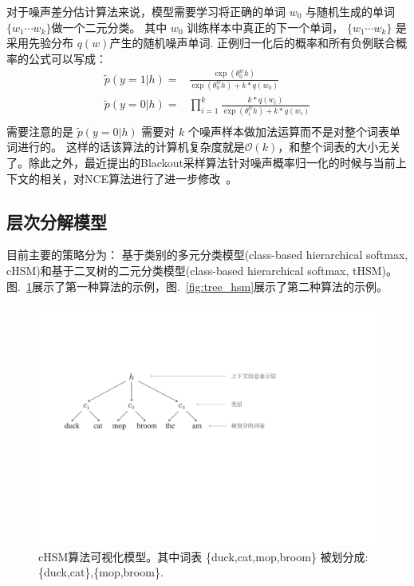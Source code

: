 \documentclass[master,openright,twoside,color]{buaathesis}
\begin{document}
对于噪声差分估计算法来说，模型需要学习将正确的单词 $w_0$ 与随机生成的单词 $\{w_1\cdots w_k\}$做一个二元分类。 其中 $w_0$ 训练样本中真正的下一个单词， $\{w_1\cdots w_k\}$ 是采用先验分布  $q(w)$产生的随机噪声单词. 正例归一化后的概率和所有负例联合概率的公式可以写成：
\begin{equation}\label{equ:nce}
\begin{split}
  \tilde{p}(y=1|h)=&\frac{\exp( \theta^w_0 h)}{ \exp( \theta^w_0 h)+k *q(w_0)}\\
  \tilde{p}(y=0|h)=&\prod_{i=1}^{k}\frac{k *q(w_i)}{\exp( \theta^w_i h)+k *q(w_i)}\\
\end{split}
\end{equation}
需要注意的是 $\tilde{p}(y=0|h)$ 需要对 $k$ 个噪声样本做加法运算而不是对整个词表单词进行的。 这样的话该算法的计算机复杂度就是$\mathcal{O}(k)$，和整个词表的大小无关了。除此之外，最近提出的Blackout采样算法针对噪声概率归一化的时候与当前上下文的相关，对NCE算法进行了进一步修改~。

\subsection{层次分解模型}
目前主要的策略分为： 基于类别的多元分类模型(class-based hierarchical softmax, cHSM)和基于二叉树的二元分类模型(class-based hierarchical softmax, tHSM)。图.~\ref{fig:case_hsm}展示了第一种算法的示例，图.~\ref{fig:tree_hsm}展示了第二种算法的示例。
\begin{figure}
  \centering
\includegraphics[width=0.7\linewidth]{./figures/case_chsm.pdf}
\caption{cHSM算法可视化模型。其中词表 \{duck,cat,mop,broom\} 被划分成:\{duck,cat\},\{mop,broom\}.}\label{fig:case_hsm}
\end{figure}
\end{document}

